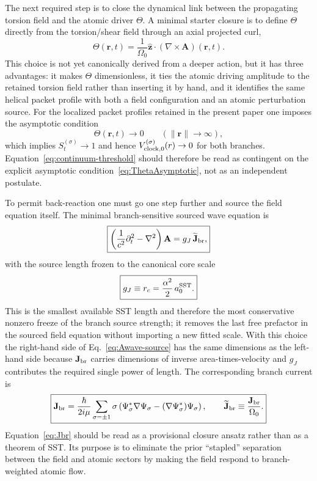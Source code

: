 \documentclass[11pt,a4paper]{article}
\begin{document}
The next required step is to close the dynamical link between the propagating torsion field and the atomic driver $\Theta$. A minimal starter closure is to define $\Theta$ directly from the torsion/shear field through an axial projected curl,
\begin{equation}
\label{eq:ThetaA}
\boxed{
\Theta(\mathbf r,t)
=
\frac{1}{\Omega_0}
\hat{\mathbf z}\cdot(\nabla\times \mathbf A)(\mathbf r,t).
}
\end{equation}
This choice is not yet canonically derived from a deeper action, but it has three advantages: it makes $\Theta$ dimensionless, it ties the atomic driving amplitude to the retained torsion field rather than inserting it by hand, and it identifies the same helical packet profile with both a field configuration and an atomic perturbation source. For the localized packet profiles retained in the present paper one imposes the asymptotic condition
\begin{equation}
\label{eq:ThetaAsymptotic}
\Theta(\mathbf r,t)\to 0 \qquad (\lVert \mathbf r\rVert\to\infty),
\end{equation}
which implies $S_t^{(\sigma)}\to 1$ and hence $V_{{\rm clock},0}^{(\sigma)}(r)\to 0$ for both branches. Equation~\eqref{eq:continuum-threshold} should therefore be read as contingent on the explicit asymptotic condition~\eqref{eq:ThetaAsymptotic}, not as an independent postulate.

To permit back-reaction one must go one step further and source the field equation itself. The minimal branch-sensitive sourced wave equation is
\begin{equation}
\label{eq:Awave-source}
\boxed{
\left(\frac{1}{c^2}\partial_t^2-\nabla^2\right)\mathbf A
=
g_J \,\widetilde{\mathbf J}_{\rm br},
}
\end{equation}
with the source length frozen to the canonical core scale
\begin{equation}
\label{eq:gJfreeze}
\boxed{
 g_J \equiv r_c = \frac{\alpha^2}{2}\,a_0^{\rm SST}.
}
\end{equation}
This is the smallest available SST length and therefore the most conservative nonzero freeze of the branch source strength; it removes the last free prefactor in the sourced field equation without importing a new fitted scale. With this choice the right-hand side of Eq.~\eqref{eq:Awave-source} has the same dimensions as the left-hand side because $\mathbf J_{\rm br}$ carries dimensions of inverse area-times-velocity and $g_J$ contributes the required single power of length. The corresponding branch current is
\begin{equation}
\label{eq:Jbr}
\boxed{
\mathbf J_{\rm br}
=
\frac{\hbar}{2 i \mu}
\sum_{\sigma=\pm 1}
\sigma
\left(
\Psi_\sigma^*\nabla\Psi_\sigma
-
(\nabla\Psi_\sigma^*)\Psi_\sigma
\right),
\qquad
\widetilde{\mathbf J}_{\rm br}\equiv \frac{\mathbf J_{\rm br}}{\Omega_0}.
}
\end{equation}
Equation~\eqref{eq:Jbr} should be read as a provisional closure ansatz rather than as a theorem of SST. Its purpose is to eliminate the prior ``stapled'' separation between the field and atomic sectors by making the field respond to branch-weighted atomic flow.
\end{document}
